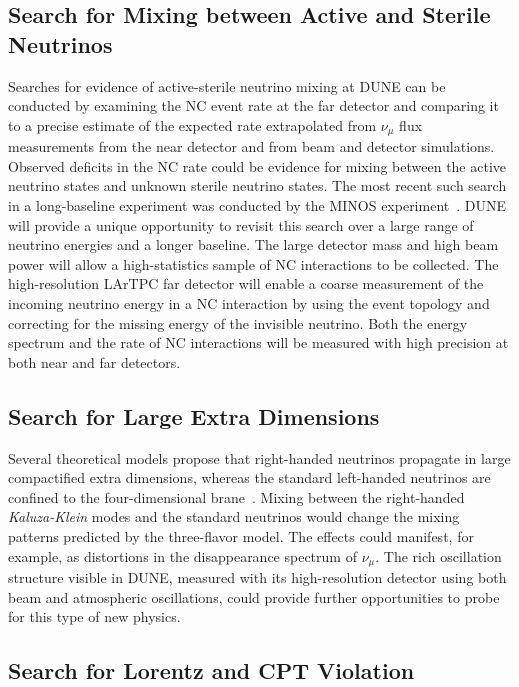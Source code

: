 \subsection{Search for Mixing between Active and Sterile Neutrinos}

Searches for evidence of active-sterile neutrino mixing at DUNE can be
conducted by examining the NC event rate at the far detector and
comparing it to a precise estimate of the expected rate extrapolated
from $\nu_\mu$ flux measurements from the  
near detector and from 
beam and detector simulations. Observed deficits in the NC rate could be evidence for mixing between the
active neutrino states and unknown sterile neutrino states. The most recent such search
in a long-baseline experiment was conducted by the MINOS
experiment~\cite{Adamson:2011ku,Sousa:2015bxa}.  DUNE will provide a unique
opportunity to revisit this search over a large
range of neutrino energies and a longer baseline. The large detector mass and high beam power will
allow a high-statistics sample of NC interactions to be collected.
The high-resolution LArTPC far detector
will enable a coarse measurement of the incoming neutrino
energy in a NC interaction by using the event topology and correcting
for the missing energy of the invisible neutrino.  Both the
energy spectrum and the rate of NC interactions will be measured
with high precision at both near and far detectors.

\subsection{Search for Large Extra Dimensions}

Several theoretical models propose that right-handed neutrinos
propagate in large compactified extra dimensions, whereas the standard
left-handed neutrinos are confined to the four-dimensional 
brane~\cite{Machado:2011wx}. Mixing between the right-handed \emph{Kaluza-Klein} 
modes and the standard
neutrinos would change the mixing patterns predicted by
the three-flavor model. The effects could manifest, for example, as distortions in the
disappearance spectrum of $\nu_\mu$.  The rich oscillation
structure visible in DUNE, measured with
its high-resolution detector
using both beam and atmospheric oscillations,
could provide further opportunities to probe for
this type of new physics.

\subsection{Search for Lorentz and CPT Violation}

